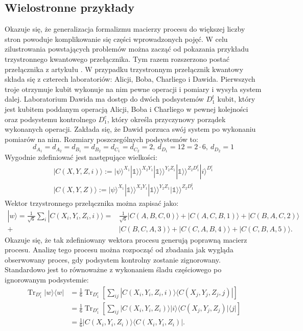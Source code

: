 \documentclass[10pt]{article} %
\DeclareMathOperator{\Trs}{Tr}
\newcommand{\Ket}[1]{|#1\rangle}
\newcommand{\Bra}[1]{\langle#1|}
\newcommand{\KKet}[1]{|#1\rangle\rangle}
\newcommand{\I}{\mathbb{1}}
\begin{document}
\subsection{Wielostronne przykłady}
Okazuje się, że generalizacja formalizmu macierzy procesu do większej liczby stron powoduje komplikowanie się części wprowadzonych pojęć. W celu zilustrowania powstających problemów można zacząć od pokazania przykładu trzystronnego kwantowego przełącznika. Tym razem rozszerzono postać przełącznika z artykułu \cite{causal_witness}. W przypadku trzystronnym przełącznik kwantowy składa się z czterech laboratoriów: Alicji, Boba, Charliego i Dawida. Pierwszych troje otrzymuje kubit wykonuje na nim pewne operacji i pomiary i wysyła system dalej. Laboratorium Dawida ma dostęp do dwóch podsystemów $D_1^t$ kubit, który jest kubitem poddanym operacją Alicji, Boba i Charliego w pewnej kolejności oraz podsystemu kontrolnego $D_1^c$, który określa przyczynowy porządek wykonanych operacji. Zakłada się, że Dawid porzuca swój system po wykonaniu pomiarów na nim. Rozmiary poszczególnych podsystemów to:
\begin{equation}
d_{A_1} = d_{A_2} = d_{B_1} = d_{B_2} = d_{C_1} = d_{C_2} = 2,~ d_{D_1} = 12 = 2 \cdot 6,~d_{D_2}=1
\end{equation}
Wygodnie zdefiniować jest następujące wielkości:
\begin{gather}
\Ket{C(X,Y,Z, i)} := \Ket{\psi}^{X_1}\KKet{\I}^{X_2Y_1}\KKet{\I}^{Y_2Z_1}\KKet{\I}^{Z_2D_1^t}\Ket{i}^{D_1^c} \\
\Ket{C(X,Y,Z)} := \Ket{\psi}^{X_1}\KKet{\I}^{X_2Y_1}\KKet{\I}^{Y_2Z_1}\KKet{\I}^{Z_2D_1^t}
\end{gather}
Wektor trzystronnego przełącznika można zapisać jako:
\begin{equation}
\begin{split}
\Ket{w} = \frac{1}{\sqrt{6}} \sum_i \Ket{C(X_i, Y_i, Z_i, i)} =& \frac{1}{\sqrt{6}} \Ket{C(A,B,C,0)} + \Ket{C(A,C,B,1)} + \Ket{C(B,A,C,2)} \\ +& \Ket{C(B,C,A,3)} + \Ket{C(C,A,B,4)} + \Ket{C(C,B,A,5)}.
\end{split}
\end{equation}
Okazuje się, że tak zdefiniowany wektora procesu generują poprawną macierz procesu. Analizę tego procesu można rozpocząć od zbadania jak wygląda obserwowany proces, gdy podsystem kontrolny zostanie zignorowany. Standardowo jest to równoważne z wykonaniem śladu częściowego po ignorowanym podsystemie:
\begin{equation}
\begin{split}
\Trs_{D_1^c} \Ket{w}\Bra{w} &= \frac{1}{6}\Trs_{D_1^c} \left[ \sum_{ij} \Ket{C(X_i, Y_i, Z_i, i)}\Bra{C(X_j, Y_j, Z_j, j)}\right] \\
&=  \frac{1}{6}\Trs_{D_1^c} \left[ \sum_{ij} \Ket{C(X_i, Y_i, Z_i)}\Ket{i}\Bra{C(X_j, Y_j, Z_j)}\Bra{j}\right] \\ 
&= \frac{1}{6}\Ket{C(X_i, Y_i, Z_i)}\Bra{C(X_i, Y_i, Z_i)}.
\end{split}
\end{equation}
\end{document}
